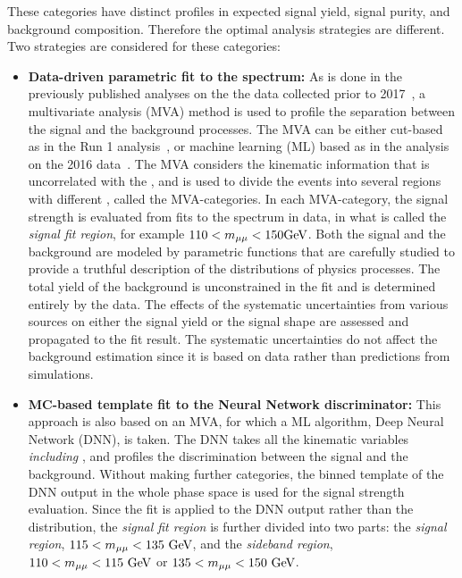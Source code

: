 These categories have distinct profiles in expected signal yield, signal purity, and background composition.
Therefore the optimal analysis strategies are different.
Two strategies are considered for these categories:

\begin{itemize}
    \item \textbf{Data-driven parametric fit to the \mmm spectrum:} 
          As is done in the previously published analyses on the the data collected prior to 2017~\cite{2015184, PhysRevLett.122.021801},  
          a multivariate analysis (MVA) method is used to profile the separation between the signal and the background processes. 
          The MVA can be either cut-based as in the Run 1 analysis~\cite{2015184}, or machine learning (ML) based as in the analysis on the 2016 data~\cite{PhysRevLett.122.021801}.
          The MVA considers the kinematic information that is uncorrelated with the \mmm, and is used to divide the events into several regions 
          with different \SoB, called the MVA-categories. 
          In each MVA-category, the signal strength is evaluated from fits to the \mmm spectrum in data, in what is called the \textit{signal fit region}, for example $110<m_{\mu\mu}<150 \mbox{GeV}$.
          Both the signal and the background are modeled by parametric functions that are carefully studied to provide a truthful description of the distributions of physics processes. 
          The total yield of the background is unconstrained in the fit and is determined entirely by the data.
          The effects of the systematic uncertainties from various sources on either the signal yield or the signal shape are assessed and propagated to the fit result. 
          The systematic uncertainties do not affect the background estimation since it is based on data rather than predictions from simulations.
    \item \textbf{MC-based template fit to the Neural Network discriminator:}
          This approach is also based on an MVA, for which a ML algorithm, Deep Neural Network (DNN), is taken.
          The DNN takes all the kinematic variables \textit{including \mmm}, and profiles the discrimination between the signal and the background.
          Without making further categories, the binned template of the DNN output in the whole phase space is used for the signal strength evaluation.
          Since the fit is applied to the DNN output rather than the \mmm distribution, the \textit{signal fit region} is further divided into two parts:
          the \textit{signal region}, $115<m_{\mu\mu}<135 ~\mbox{GeV}$, and the \textit{sideband region}, $110<m_{\mu\mu}<115 ~\mbox{GeV}$ or $135<m_{\mu\mu}<150 ~\mbox{GeV}$.

\end{itemize}
